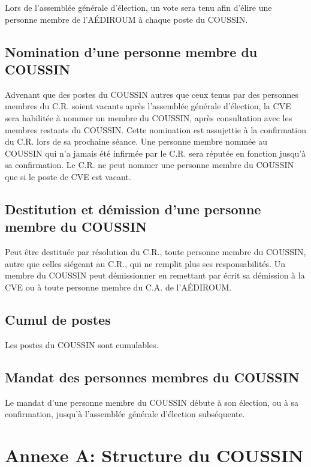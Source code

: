 \documentclass{aediroum}
\begin{document}
Lors de l'assemblée générale d'élection, un vote sera tenu afin d'élire une personne membre de l'AÉDIROUM à chaque poste du COUSSIN.

\subsection{Nomination d'une personne membre du COUSSIN}\label{sec:nomination-coussin}

Advenant que des postes du COUSSIN autres que ceux tenus par des personnes membres du C.R. soient vacants après l'assemblée générale d'élection, la CVE sera habilitée à nommer un membre du COUSSIN, après consultation avec les membres restants du COUSSIN. Cette nomination est assujettie à la confirmation du C.R. lors de sa prochaine séance. Une personne membre nommée au COUSSIN qui n'a jamais été infirmée par le C.R. sera réputée en fonction jusqu'à sa confirmation. Le C.R. ne peut nommer une personne membre du COUSSIN que si le poste de CVE est vacant.

\subsection{Destitution et démission d'une personne membre du COUSSIN}\label{sec:destitution-coussin}

Peut être destituée par résolution du C.R., toute personne membre du COUSSIN, autre que celles siégeant au C.R., qui ne remplit plus ses responsabilités. Un membre du COUSSIN peut démissionner en remettant par écrit sa démission à la CVE ou à toute personne membre du C.A. de l'AÉDIROUM.

\subsection{Cumul de postes}\label{sec:cumul}

Les postes du COUSSIN sont cumulables.

\subsection{Mandat des personnes membres du COUSSIN}\label{sec:mandat-coussin}

Le mandat d'une personne membre du COUSSIN débute à son élection, ou à sa confirmation, jusqu'à l'assemblée générale d'élection subséquente.

\section{Annexe A: Structure du COUSSIN}\label{sec:structure-coussin}
\end{document}
